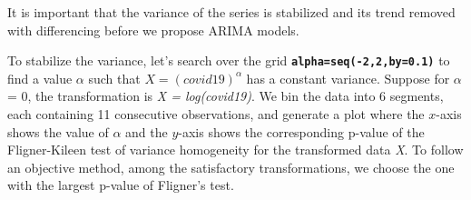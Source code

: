 \documentclass[]{article}
\newenvironment{Shaded}{\begin{snugshade}}{\end{snugshade}}
\newcommand{\CommentTok}[1]{\textcolor[rgb]{0.56,0.35,0.01}{\textit{#1}}}
\newcommand{\ControlFlowTok}[1]{\textcolor[rgb]{0.13,0.29,0.53}{\textbf{#1}}}
\newcommand{\DataTypeTok}[1]{\textcolor[rgb]{0.13,0.29,0.53}{#1}}
\newcommand{\DecValTok}[1]{\textcolor[rgb]{0.00,0.00,0.81}{#1}}
\newcommand{\FloatTok}[1]{\textcolor[rgb]{0.00,0.00,0.81}{#1}}
\newcommand{\KeywordTok}[1]{\textcolor[rgb]{0.13,0.29,0.53}{\textbf{#1}}}
\newcommand{\NormalTok}[1]{#1}
\newcommand{\OperatorTok}[1]{\textcolor[rgb]{0.81,0.36,0.00}{\textbf{#1}}}
\newcommand{\StringTok}[1]{\textcolor[rgb]{0.31,0.60,0.02}{#1}}
\begin{document}
It is important that the variance of the series is stabilized and its
trend removed with differencing before we propose ARIMA models.

\newpage

To stabilize the variance, let's search over the grid
\textbf{\texttt{alpha=seq(-2,2,by=0.1)}} to find a value
\emph{\(\alpha\)} such that \emph{\(X = (covid19)^\alpha\)} has a
constant variance. Suppose for \(\alpha\) = 0, the transformation is
\emph{X = log(covid19)}. We bin the data into 6 segments, each
containing 11 consecutive observations, and generate a plot where the
\(x\)-axis shows the value of \(\alpha\) and the \(y\)-axis shows the
corresponding p-value of the Fligner-Kileen test of variance homogeneity
for the transformed data \emph{X}. To follow an objective method, among
the satisfactory transformations, we choose the one with the largest
p-value of Fligner's test.

\begin{Shaded}
\end{Shaded}
\end{document}
